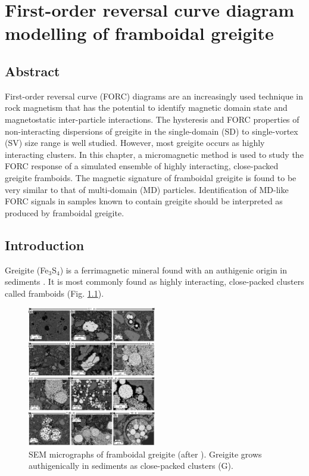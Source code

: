 \chapter{First-order reversal curve diagram modelling of framboidal greigite}
\label{ch:res-4}

\section*{Abstract}
First-order reversal curve (FORC) diagrams are an increasingly used technique in rock magnetism that has the potential to identify magnetic domain state and magnetostatic inter-particle interactions. The hysteresis and FORC properties of non-interacting dispersions of greigite in the single-domain (SD) to single-vortex (SV) size range is well studied. However, most greigite occurs as highly interacting clusters. In this chapter, a micromagnetic method is used to study the FORC response of a simulated ensemble of highly interacting, close-packed greigite framboids. The magnetic signature of framboidal greigite is found to be very similar to that of multi-domain (MD) particles. Identification of MD-like FORC signals in samples known to contain greigite should be interpreted as produced by framboidal greigite.

\section{Introduction}
Greigite (Fe$_3$S$_4$) is a ferrimagnetic mineral found with an authigenic origin in sediments \citep{Roberts2011}. It is most commonly found as highly interacting, close-packed clusters called framboids \citep{Rowan2006,Rowan2009,Roberts2011} (Fig. \ref{FIG_00}).
\begin{figure}
\centering
\includegraphics[width=0.5\textwidth]{research-4/figs/framboids_rowan.pdf}
\caption[SEM micrographs of framboidal greigite]{SEM micrographs of framboidal greigite (after \citet{Rowan2009}). Greigite grows authigenically in sediments as close-packed clusters (G).}
\label{FIG_00}
\end{figure}\par

